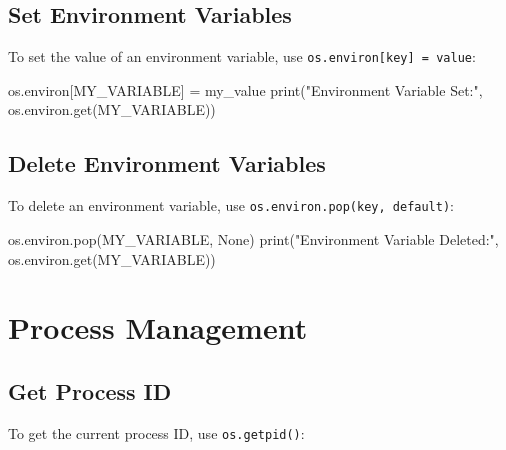\documentclass[
  letterpaper,
  DIV=11,
  numbers=noendperiod]{scrreprt}
\newenvironment{Shaded}{\begin{snugshade}}{\end{snugshade}}
\newcommand{\BuiltInTok}[1]{\textcolor[rgb]{0.00,0.23,0.31}{#1}}
\newcommand{\NormalTok}[1]{\textcolor[rgb]{0.00,0.23,0.31}{#1}}
\newcommand{\OperatorTok}[1]{\textcolor[rgb]{0.37,0.37,0.37}{#1}}
\newcommand{\StringTok}[1]{\textcolor[rgb]{0.13,0.47,0.30}{#1}}
\newcommand{\VariableTok}[1]{\textcolor[rgb]{0.07,0.07,0.07}{#1}}
\begin{document}
\subsection{Set Environment Variables}\label{set-environment-variables}

To set the value of an environment variable, use
\texttt{os.environ{[}key{]}\ =\ value}:

\begin{Shaded}
\begin{Highlighting}[]
\NormalTok{os.environ[}\StringTok{\textquotesingle{}MY\_VARIABLE\textquotesingle{}}\NormalTok{] }\OperatorTok{=} \StringTok{\textquotesingle{}my\_value\textquotesingle{}}
\BuiltInTok{print}\NormalTok{(}\StringTok{"Environment Variable Set:"}\NormalTok{, os.environ.get(}\StringTok{\textquotesingle{}MY\_VARIABLE\textquotesingle{}}\NormalTok{))}
\end{Highlighting}
\end{Shaded}

\subsection{Delete Environment
Variables}\label{delete-environment-variables}

To delete an environment variable, use
\texttt{os.environ.pop(key,\ default)}:

\begin{Shaded}
\begin{Highlighting}[]
\NormalTok{os.environ.pop(}\StringTok{\textquotesingle{}MY\_VARIABLE\textquotesingle{}}\NormalTok{, }\VariableTok{None}\NormalTok{)}
\BuiltInTok{print}\NormalTok{(}\StringTok{"Environment Variable Deleted:"}\NormalTok{, os.environ.get(}\StringTok{\textquotesingle{}MY\_VARIABLE\textquotesingle{}}\NormalTok{))}
\end{Highlighting}
\end{Shaded}

\section{Process Management}\label{process-management}

\subsection{Get Process ID}\label{get-process-id}

To get the current process ID, use \texttt{os.getpid()}:
\end{document}
